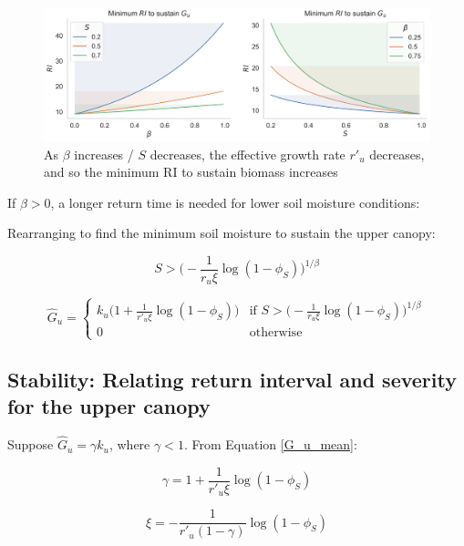 \documentclass{article}
\begin{document}
\begin{figure}[h]
 \centering
  \includegraphics[width=33pc]{../fire_plots/stability_min_RI.png}
 \caption{ As $\beta$ increases / $S$ decreases, the effective growth rate $r'_u$ decreases, and so the minimum RI to sustain biomass increases }
 \label{fig:stability_min_RI.png}
 \end{figure}
 
        
If $\beta>0$, a longer return time is needed for lower soil moisture conditions:


Rearranging to find the minimum soil moisture to sustain the upper canopy:

\begin{equation}
S > \bigg( - \frac{1}{r_u \xi }\log (1 - \phi_S)\bigg)^{1/\beta}
\end{equation}

\begin{equation}
\hat{G}_u  =
    \begin{cases}
       k_u \big( 1 + \frac{1}{r'_u \xi} \log(1-\phi_S) \big)
	  & \text{if  } S > \big( - \frac{1}{r_u \xi }\log (1 - \phi_S)\big)^{1/\beta}
		\\[10pt]
      0 & \text{otherwise}
    \end{cases}
\end{equation}



\subsection{Stability: Relating return interval and severity for the upper canopy}
        
        Suppose $\hat G_u = \gamma k_u$, where $\gamma<1$. From  Equation \ref{G_u_mean}:
        
        \begin{equation}
        \gamma =  1 + \frac{1}{r'_u \xi} \log(1-\phi_S)
        \end{equation}
        
        \begin{equation}
        \xi = -\frac{1}{r'_u (1-\gamma) }\log(1-\phi_S)
        \end{equation}
        
\end{document}
